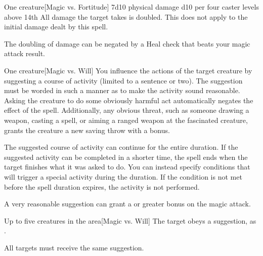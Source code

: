 \spellrng{\rngclose}
\spelldur{\durshort}
\begin{spelltarget}{One creature}[Magic vs. Fortitude]
    \spelleffect 7d10 physical damage \add d10 per four caster levels above 14th
    \spellsuccess All damage the target takes is doubled. This does not apply to the initial damage dealt by this spell.
\end{spelltarget}
\spellnotes The doubling of damage can be negated by a Heal check that beats your magic attack result.

\spellrng{\rngclose}
\begin{spelltarget}{One creature}[Magic vs. Will]
    \spelleffect You influence the actions of the target creature by suggesting a course of activity (limited to a sentence or two). The suggestion must be worded in such a manner as to make the activity sound reasonable. Asking the creature to do some obviously harmful act automatically negates the effect of the spell. Additionally, any obvious threat, such as someone drawing a weapon, casting a spell, or aiming a ranged weapon at the fascinated creature, grants the creature a new saving throw with a  bonus.
    \par The suggested course of activity can continue for the entire duration. If the suggested activity can be completed in a shorter time, the spell ends when the target finishes what it was asked to do. You can instead specify conditions that will trigger a special activity during the duration. If the condition is not met before the spell duration expires, the activity is not performed.
\end{spelltarget}
\spellnotes A very reasonable suggestion can grant a  or greater bonus on the magic attack.

\norepeatspellnotes

\spelldur{\durmed}
\begin{spelltargets}{Up to five creatures in the area}[Magic vs. Will]
    \spelleffect The target obeys a suggestion, as .
\end{spelltargets}
\spellnotes All targets must receive the same suggestion.

